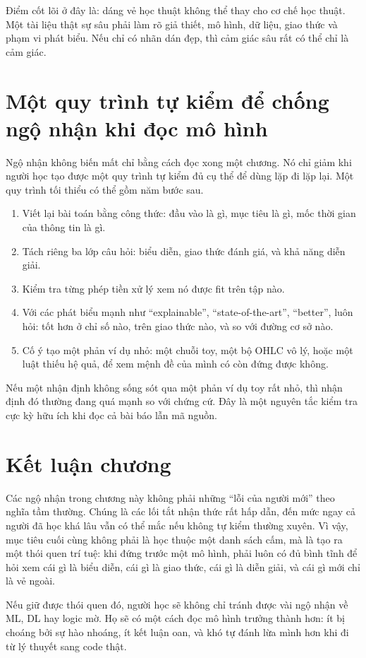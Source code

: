 Điểm cốt lõi ở đây là: dáng vẻ học thuật không thể thay cho cơ chế học thuật. Một tài liệu thật sự sâu phải làm rõ giả thiết, mô hình, dữ liệu, giao thức và phạm vi phát biểu. Nếu chỉ có nhãn dán đẹp, thì cảm giác sâu rất có thể chỉ là cảm giác.

\section{Một quy trình tự kiểm để chống ngộ nhận khi đọc mô hình}

Ngộ nhận không biến mất chỉ bằng cách đọc xong một chương. Nó chỉ giảm khi người học tạo được một quy trình tự kiểm đủ cụ thể để dùng lặp đi lặp lại. Một quy trình tối thiểu có thể gồm năm bước sau.

\begin{enumerate}
\item Viết lại bài toán bằng công thức: đầu vào là gì, mục tiêu là gì, mốc thời gian của thông tin là gì.
\item Tách riêng ba lớp câu hỏi: biểu diễn, giao thức đánh giá, và khả năng diễn giải.
\item Kiểm tra từng phép tiền xử lý xem nó được fit trên tập nào.
\item Với các phát biểu mạnh như ``explainable'', ``state-of-the-art'', ``better'', luôn hỏi: tốt hơn ở chỉ số nào, trên giao thức nào, và so với đường cơ sở nào.
\item Cố ý tạo một phản ví dụ nhỏ: một chuỗi toy, một bộ OHLC vô lý, hoặc một luật thiếu hệ quả, để xem mệnh đề của mình có còn đứng được không.
\end{enumerate}

\begin{remark}
Nếu một nhận định không sống sót qua một phản ví dụ toy rất nhỏ, thì nhận định đó thường đang quá mạnh so với chứng cứ. Đây là một nguyên tắc kiểm tra cực kỳ hữu ích khi đọc cả bài báo lẫn mã nguồn.
\end{remark}

\section{Kết luận chương}

Các ngộ nhận trong chương này không phải những ``lỗi của người mới'' theo nghĩa tầm thường. Chúng là các lối tắt nhận thức rất hấp dẫn, đến mức ngay cả người đã học khá lâu vẫn có thể mắc nếu không tự kiểm thường xuyên. Vì vậy, mục tiêu cuối cùng không phải là học thuộc một danh sách cấm, mà là tạo ra một thói quen trí tuệ: khi đứng trước một mô hình, phải luôn có đủ bình tĩnh để hỏi xem cái gì là biểu diễn, cái gì là giao thức, cái gì là diễn giải, và cái gì mới chỉ là vẻ ngoài.

Nếu giữ được thói quen đó, người học sẽ không chỉ tránh được vài ngộ nhận về ML, DL hay logic mờ. Họ sẽ có một cách đọc mô hình trưởng thành hơn: ít bị choáng bởi sự hào nhoáng, ít kết luận oan, và khó tự đánh lừa mình hơn khi đi từ lý thuyết sang code thật.
